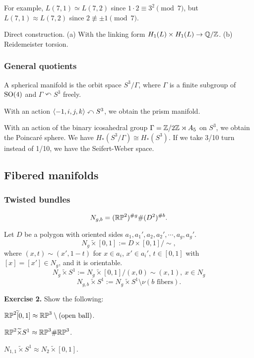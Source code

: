 \documentclass{../../../small}
\begin{document}
For example, $L(7,1)\simeq L(7,2)$ since $1\cdot2\equiv 3^2\pmod7$, but $L(7,1)\approx L(7,2)$ since $2\not\equiv\pm1\pmod7$.
\begin{pf}
Direct construction.
(a) With the linking form $H_1(L)\times H_1(L)\to\mathbb{Q}/\mathbb{Z}$.
(b) Reidemeister torsion. 
\end{pf}

\subsubsection*{General quotients}
A spherical manifold is the orbit space $S^3/\Gamma$, where $\Gamma$ is a finite subgroup of $\mathrm{SO}(4)$ and $\Gamma\curvearrowleft S^3$ freely.

\begin{ex*}
With an action $\langle-1,i,j,k\rangle\curvearrowleft S^3$, we obtain the prism manifold.
\end{ex*}
\begin{ex*}
With an action of the binary icosahedral group $\Gamma=\mathbb{Z}/2\mathbb{Z}\rtimes A_5$ on $S^3$, we obtain the Poincar\'e sphere.
We have $H_*(S^3/\Gamma)\cong H_*(S^3)$.
If we take 3/10 turn instead of 1/10, we have the Seifert-Weber space.
\end{ex*}

\subsection{Fibered manifolds}


\subsubsection*{Twisted bundles}
\[N_{g,b}=(\mathbb{RP}^2)^{\#g}\#(D^2)^{\#b}.\]

Let $D$ be a polygon with oriented sides $a_1,a_1',a_2,a_2',\cdots,a_g,a_g'$.
\[N_g\tilde\times[0,1]:=D\times[0,1]/\sim,\] where $(x,t)\sim(x',1-t)$ for $x\in a_i$, $x'\in a_i'$, $t\in[0,1]$ with $[x]=[x']\in N_g$, and it is orientable.
\[N_g\tilde\times S^1:=N_g\tilde\times[0,1]/(x,0)\sim(x,1),\ x\in N_g\]
\[N_{g,b}\tilde\times S^1:=N_g\tilde\times S^1\setminus\nu(b\text{ fibers}).\]

\textbf{Exercise 2.} Show the following:
\begin{parts}
\item $\mathbb{RP}^2\widetilde[0,1]\approx\mathbb{RP}^3\setminus\text{(open ball)}$.
\item $\mathbb{RP}^2\widetilde\times S^1\approx\mathbb{RP}^3\#\mathbb{RP}^3$.
\item $N_{1,1}\tilde\times S^1\approx N_2\tilde\times[0,1]$.
\end{parts}
\end{document}
